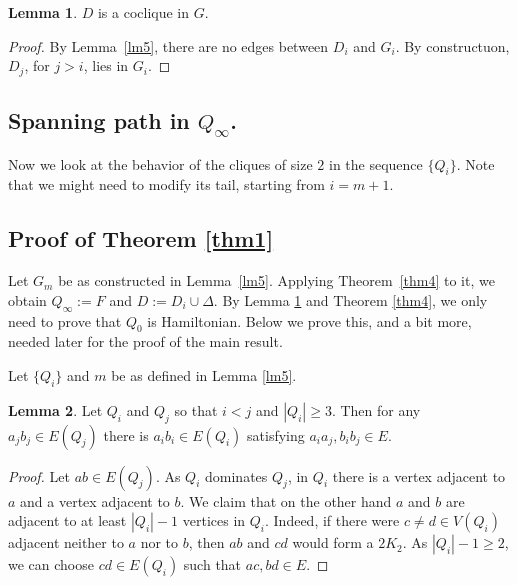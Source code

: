 \documentclass{amsart}
\theoremstyle{definition}
\newtheorem{lemma}{Lemma}
\begin{document}
\begin{lemma}\label{lmDcoclique}
$D$ is a coclique in $G$.
\end{lemma}
\begin{proof}
By Lemma~\ref{lm5}, there are no edges between $D_i$ and $G_i$. By constructuon, 
$D_j$, for $j>i$, lies in $G_i$.
\end{proof}

\subsection{Spanning path in $Q_{\infty}$.}
Now we look at the behavior of the cliques of size $2$ in the sequence $\{Q_i\}$. Note that
we might need to modify its tail, starting from $i=m+1$.

\subsection{Proof of Theorem \ref{thm1}}
Let $G_m$ be as constructed in Lemma~\ref{lm5}. Applying Theorem~\ref{thm4} to it, 
we obtain $Q_\infty:=F$ and $D:=D_i\cup\Delta$. 
By Lemma \ref{lmDcoclique} and Theorem \ref{thm4}, we only need to prove that $Q_0$ is Hamiltonian.
Below we prove this, and a bit more, needed later for the proof of the main result.

Let $\{Q_i\}$ and $m$ be as defined in Lemma \ref{lm5}.
\begin{lemma}\label{lem:twoQ}
Let $Q_i$ and $Q_j$ so that $i<j$ and $|Q_i|\geq 3$.
Then for any $a_j b_j\in E(Q_j)$  there is $a_i b_i\in E(Q_i)$ satisfying
$a_i a_j, b_i b_j\in E$.
\end{lemma}
\begin{proof}
Let $ab\in E(Q_j)$. As $Q_i$ dominates $Q_j$, in $Q_i$ there is a vertex adjacent to 
$a$ and a vertex adjacent to $b$.
We claim that on the other hand $a$ and $b$ are adjacent to at least $|Q_i|-1$ vertices in $Q_i$. 
Indeed, if there were $c\neq d\in V(Q_i)$ adjacent neither to $a$ nor to $b$, 
then $ab$ and $cd$ would form a $2K_2$.
As $|Q_i|-1\ge 2$, we can choose $cd\in E(Q_i)$ such that $ac, bd\in E$.
\end{proof}
 
\end{document}
